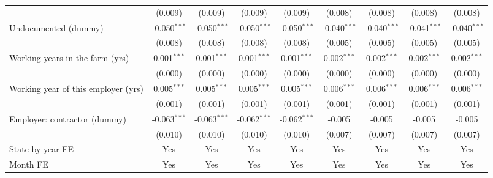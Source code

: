\documentclass[12pt]{article}
\newcommand{\sym}[1]{\ensuremath{^{#1}}}
\begin{document}
\begin{appendices}
\begin{table}[h!]
\begin{tabular}{l*{8}{c}}
                    &     (0.009)         &     (0.009)         &     (0.009)         &     (0.009)         &     (0.008)         &     (0.008)         &     (0.008)         &     (0.008)         \\
Undocumented (dummy)&      -0.050\sym{***}&      -0.050\sym{***}&      -0.050\sym{***}&      -0.050\sym{***}&      -0.040\sym{***}&      -0.040\sym{***}&      -0.041\sym{***}&      -0.040\sym{***}\\
                    &     (0.008)         &     (0.008)         &     (0.008)         &     (0.008)         &     (0.005)         &     (0.005)         &     (0.005)         &     (0.005)         \\
Working years in the farm (yrs)&       0.001\sym{***}&       0.001\sym{***}&       0.001\sym{***}&       0.001\sym{***}&       0.002\sym{***}&       0.002\sym{***}&       0.002\sym{***}&       0.002\sym{***}\\
                    &     (0.000)         &     (0.000)         &     (0.000)         &     (0.000)         &     (0.000)         &     (0.000)         &     (0.000)         &     (0.000)         \\
Working year of this employer (yrs)&       0.005\sym{***}&       0.005\sym{***}&       0.005\sym{***}&       0.005\sym{***}&       0.006\sym{***}&       0.006\sym{***}&       0.006\sym{***}&       0.006\sym{***}\\
                    &     (0.001)         &     (0.001)         &     (0.001)         &     (0.001)         &     (0.001)         &     (0.001)         &     (0.001)         &     (0.001)         \\
Employer: contractor (dummy)&      -0.063\sym{***}&      -0.063\sym{***}&      -0.062\sym{***}&      -0.062\sym{***}&      -0.005         &      -0.005         &      -0.005         &      -0.005         \\
                    &     (0.010)         &     (0.010)         &     (0.010)         &     (0.010)         &     (0.007)         &     (0.007)         &     (0.007)         &     (0.007)         \\
\hline
State-by-year FE    &         Yes         &         Yes         &         Yes         &         Yes         &         Yes         &         Yes         &         Yes         &         Yes         \\
Month FE            &         Yes         &         Yes         &         Yes         &         Yes         &         Yes         &         Yes         &         Yes         &         Yes         \\

\end{tabular}
\end{table}
\end{appendices}
\end{document}
